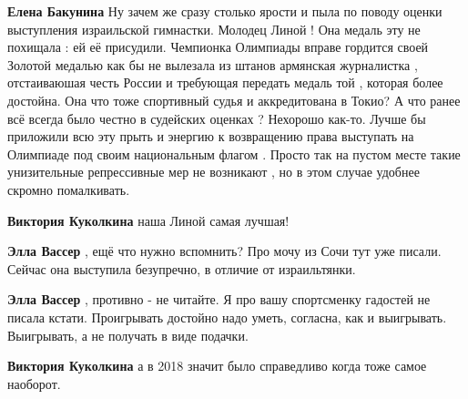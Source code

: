 \begin{itemize}
\begin{itemize}
\textbf{Елена Бакунина} Ну зачем же сразу столько ярости и пыла по поводу
оценки выступления израильской гимнастки. Молодец Линой ! Она медаль эту не
похищала : ей её присудили. Чемпионка Олимпиады вправе гордится своей Золотой
медалью как бы не вылезала из штанов армянская журналистка , отстаиваюшая честь
России и требующая передать медаль той , которая более достойна. Она что тоже
спортивный судья и аккредитована в Токио? А что ранее всё всегда было честно в
судейских оценках ? Нехорошо как-то. Лучше бы приложили всю эту прыть и энергию
к возвращению права выступать на Олимпиаде под своим национальным флагом .
Просто так на пустом месте такие унизительные репрессивные мер не возникают ,
но в этом случае удобнее скромно помалкивать.

 
\textbf{Виктория Куколкина} наша Линой самая лучшая!

 
\textbf{Элла Вассер} , ещё что нужно вспомнить? Про мочу из Сочи тут уже писали. Сейчас она выступила безупречно, в отличие от израильтянки.

 
\textbf{Элла Вассер} , противно - не читайте. Я про вашу спортсменку гадостей не писала кстати. Проигрывать достойно надо уметь, согласна, как и выигрывать. Выигрывать, а не получать в виде подачки.

 
\textbf{Виктория Куколкина} а в 2018 значит было справедливо когда тоже самое наоборот.


\end{itemize}
\end{itemize}
